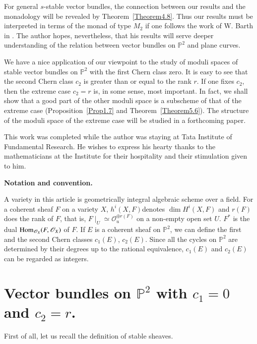 For general $s$-stable vector bundles, the connection between our
results and the monadology will be revealed by Theorem~\ref{Theorem4.8}. Thus our results must be interpreted in terms of the monad of type
$M_2$ if one follows the work of W. Barth in \cite{key2}. The author
hopes, nevertheless, that his results will serve deeper understanding
of the relation between vector bundles on $\mathbb{P}^{2}$ and plane
curves. 

We have a nice application of our viewpoint to the study of moduli
spaces of stable vector bundles on $\mathbb{P}^{2}$ with the first
Chern class zero. It is easy to see that the second Chern class $c_2$
is greater than or equal to the rank $r$. If one fixes $c_2$, then the
extreme case $c_2=r$ is, in some sense, most important. In fact, we
shall show that a good part of the other moduli space is a subscheme
of that of the extreme case (Proposition~\ref{Prop1.7} and
Theorem~\ref{Theorem5.6}). The structure of the moduli space of the
extreme case will be studied in a forthcoming paper.

This work was completed while the author was staying at Tata Institute
of Fundamental Research. He wishes to express his hearty thanks to the
mathematicians at the Institute for their hospitality and their
stimulation given to him.

\smallskip
\noindent
\textbf{Notation and convention.}

A variety in this article is geometrically integral algebraic scheme
over a field. For a coherent sheaf $F$ on a variety $X$,
$h^{i}(X,F)$\pageoriginale denotes $\dim H^{i}(X,F)$ and $r(F)$ does
the rank of $F$, that is, 
$F\mid_U\simeq\mathscr{O}^{\oplus r(F)}_{u}$ on a non-empty open
set $U$. $F^{\ast}$ is the dual
$\operatorname{Hom}_{\mathscr{O}_X}(F,\mathscr{O}_X)$ of $F$. If $E$ is a coherent
sheaf on $\mathbb{P}^{2}$, we can define the first and the second
Chern classes $c_1(E)$, $c_2(E)$. Since all the cycles on
$\mathbb{P}^{2}$ are determined by their degrees up to the rational
equivalence, $c_1(E)$ and $c_2(E)$ can be regarded as integers.

\section{Vector bundles on \texorpdfstring{$\mathbb{P}^{2}$}{eq} with \texorpdfstring{$c_1=0$}{eq} and \texorpdfstring{$c_2=r$}{eq}.}\label{s1}

First of all, let us recall the definition of stable sheaves.

